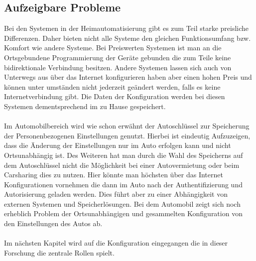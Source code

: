 \subsection{Aufzeigbare Probleme}
Bei den Systemen in der Heimautomatisierung gibt es zum Teil starke preisliche Differenzen. Daher bieten nicht alle Systeme den gleichen Funktionsumfang bzw. Komfort wie andere Systeme. 
Bei Preiswerten Systemen ist man an die Ortsgebundene Programmierung der Geräte gebunden die zum Teile keine bidirektionale Verbindung besitzen. Andere Systemen lassen sich auch von Unterwegs aus über das Internet konfigurieren haben aber einen hohen Preis und können unter umständen nicht jederzeit geändert werden, falls es keine Internetverbindung gibt. Die Daten der Konfiguration werden bei diesen Systemen dementsprechend im zu Hause gespeichert. 
\\\\
Im Automobilbereich wird wie schon erwähnt der Autoschlüssel zur Speicherung der Personenbezogenen Einstellungen genutzt. Hierbei ist eindeutig Aufzuzeigen, dass die Änderung der Einstellungen nur im Auto erfolgen kann und nicht Ortsunabhängig ist. Des Weiteren hat man durch die Wahl des Speicherns auf dem Autoschlüssel nicht die Möglichkeit bei einer Autovermietung oder beim Carsharing dies zu nutzen. Hier könnte man höchsten über das Internet Konfigurationen vornehmen die dann im Auto nach der Authentifizierung und Autorisierung geladen werden.
Dies führt aber zu einer Abhängigkeit von externen Systemen und Speicherlösungen. Bei dem Automobil zeigt sich noch erheblich Problem der Ortsunabhängigen und gesammelten Konfiguration von den Einstellungen des Autos ab. 
\\\\
Im nächsten Kapitel wird auf die Konfiguration eingegangen die in dieser Forschung die zentrale Rollen spielt.

